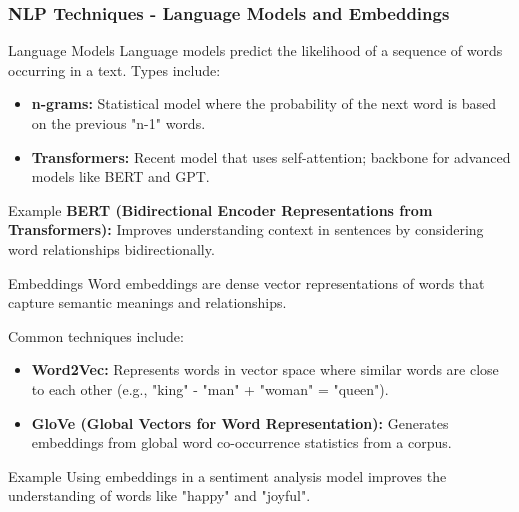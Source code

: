 \documentclass{beamer}
\begin{document}
\begin{frame}[fragile]
    \frametitle{NLP Techniques - Language Models and Embeddings}
    \begin{block}{Language Models}
        Language models predict the likelihood of a sequence of words occurring in a text. Types include:
        \begin{itemize}
            \item \textbf{n-grams:} Statistical model where the probability of the next word is based on the previous "n-1" words.
            \item \textbf{Transformers:} Recent model that uses self-attention; backbone for advanced models like BERT and GPT.
        \end{itemize}
        
        \begin{block}{Example}
            \textbf{BERT (Bidirectional Encoder Representations from Transformers):} Improves understanding context in sentences by considering word relationships bidirectionally.
        \end{block}
    \end{block}

    \begin{block}{Embeddings}
        Word embeddings are dense vector representations of words that capture semantic meanings and relationships.
        
        Common techniques include:
        \begin{itemize}
            \item \textbf{Word2Vec:} Represents words in vector space where similar words are close to each other (e.g., "king" - "man" + "woman" = "queen").
            \item \textbf{GloVe (Global Vectors for Word Representation):} Generates embeddings from global word co-occurrence statistics from a corpus.
        \end{itemize}
        
        \begin{block}{Example}
            Using embeddings in a sentiment analysis model improves the understanding of words like "happy" and "joyful".
        \end{block}
    \end{block}
\end{frame}
\end{document}
